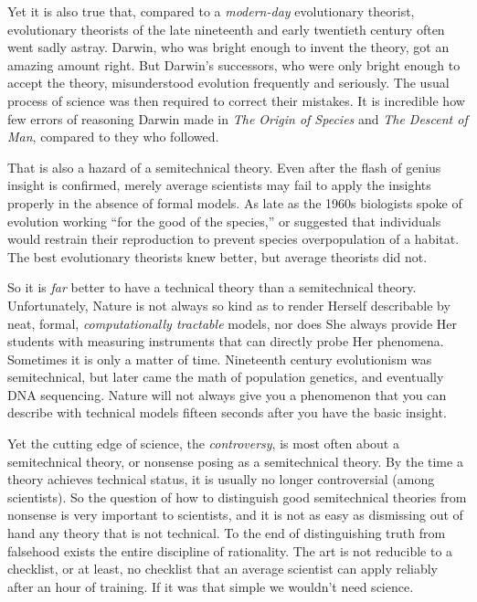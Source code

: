 {
 Yet it is also true that, compared to a \textit{modern-day}
evolutionary theorist, evolutionary theorists of the late nineteenth
and early twentieth century often went sadly astray. Darwin, who was
bright enough to invent the theory, got an amazing amount right. But
Darwin's successors, who were only bright enough to
accept the theory, misunderstood evolution frequently and seriously.
The usual process of science was then required to correct their
mistakes. It is incredible how few errors of reasoning
Darwin made in \textit{The Origin of Species} and
\textit{The Descent of Man}, compared to they who followed.}

{
 That is also a hazard of a semitechnical theory. Even after the
flash of genius insight is confirmed, merely average scientists may
fail to apply the insights properly in the absence of formal models. As
late as the 1960s biologists spoke of evolution working
``for the good of the species,'' or
suggested that individuals would restrain their reproduction to prevent
species overpopulation of a habitat. The best evolutionary theorists
knew better, but average theorists did not.}

{
 So it is \textit{far} better to have a technical theory than a
semitechnical theory. Unfortunately, Nature is not always so kind as to
render Herself describable by neat, formal, \textit{computationally
tractable} models, nor does She always provide Her students with
measuring instruments that can directly probe Her phenomena. Sometimes
it is only a matter of time. Nineteenth century evolutionism was
semitechnical, but later came the math of population genetics, and
eventually DNA sequencing. Nature will not always give you a phenomenon
that you can describe with technical models fifteen seconds after you
have the basic insight.}

{
 Yet the cutting edge of science, the \textit{controversy}, is most
often about a semitechnical theory, or nonsense posing as a
semitechnical theory. By the time a theory achieves technical status,
it is usually no longer controversial (among scientists). So the
question of how to distinguish good semitechnical theories from
nonsense is very important to scientists, and it is not as easy as
dismissing out of hand any theory that is not technical. To the end of
distinguishing truth from falsehood exists the entire discipline of
rationality. The art is not reducible to a checklist, or at least, no
checklist that an average scientist can apply reliably after an hour of
training. If it was that simple we wouldn't need
science.}


